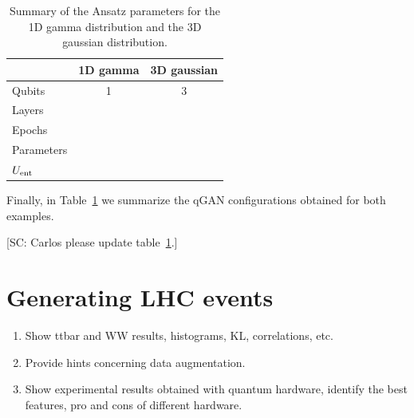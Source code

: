 \documentclass[twocolumn,preprintnumbers,superscriptaddress]{revtex4-2}
\begin{document}
\begin{table}
  \begin{tabular}{l|c|c}
     & {\bf 1D gamma} & {\bf 3D gaussian} \tabularnewline
    \hline
    Qubits & 1 & 3 \tabularnewline
    Layers & & \tabularnewline
    Epochs & & \tabularnewline
    Parameters & & \tabularnewline
    $U_{\rm ent}$ & & \tabularnewline
    \hline
  \end{tabular}

  \caption{\label{table:summary} Summary of the Ansatz parameters for the 1D
  gamma distribution and the 3D gaussian distribution.}

\end{table}

Finally, in Table~\ref{table:summary} we summarize the qGAN configurations
obtained for both examples.

{\color{red}[SC: Carlos please update table~\ref{table:summary}.]}

\section{Generating LHC events}
\label{sec:lhc}

\begin{enumerate}
  \item Show ttbar and WW results, histograms, KL, correlations, etc.
  \item Provide hints concerning data augmentation.
  \item Show experimental results obtained with quantum hardware, identify the
        best features, pro and cons of different hardware.
\end{enumerate}
\end{document}

